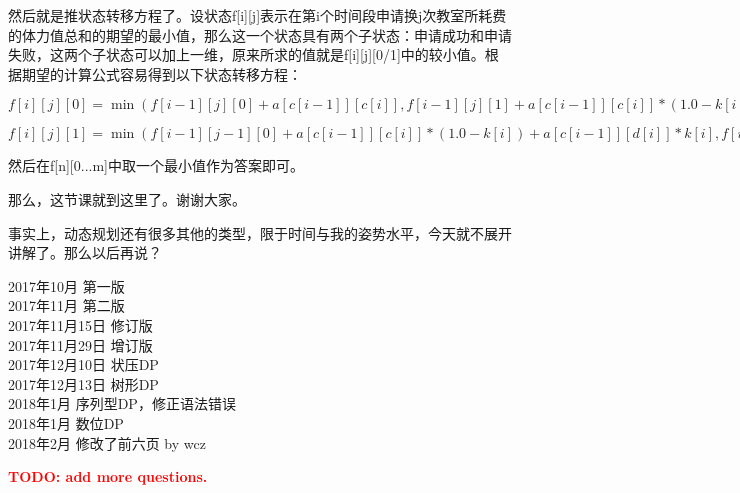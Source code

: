 	然后就是推状态转移方程了。设状态f[i][j]表示在第i个时间段申请换j次教室所耗费的体力值总和的期望的最小值，那么这一个状态具有两个子状态：申请成功和申请失败，这两个子状态可以加上一维，原来所求的值就是f[i][j][0/1]中的较小值。根据期望的计算公式容易得到以下状态转移方程：

$f[i][j][0]=\min(f[i-1][j][0]+a[c[i-1]][c[i]],f[i-1][j][1]+a[c[i-1]][c[i]]*(1.0-k[i-1])+a[d[i-1]][c[i]]*k[i-1]); $

$f[i][j][1]=\min(f[i-1][j-1][0]+a[c[i-1]][c[i]]*(1.0-k[i])+a[c[i-1]][d[i]]*k[i],f[i-1][j-1][1]+a[c[i-1]][c[i]]*(1.0-k[i])*(1.0-k[i-1])+a[d[i-1]][c[i]]*k[i-1]*(1.0-k[i])+a[c[i-1]][d[i]]*(1.0-k[i-1])*(k[i])+a[d[i-1]][d[i]]*k[i-1]*k[i]);$

然后在f[n][0...m]中取一个最小值作为答案即可。

那么，这节课就到这里了。谢谢大家。

事实上，动态规划还有很多其他的类型，限于时间与我的姿势水平，今天就不展开讲解了。那么以后再说？

\note


\begin{flushright}
	2017年10月 第一版\\
	2017年11月 第二版\\
	2017年11月15日 修订版\\
	2017年11月29日 增订版\\
	2017年12月10日 状压DP\\
	2017年12月13日 树形DP\\
	2018年1月 序列型DP，修正语法错误\\
	2018年1月 数位DP\\
	2018年2月 修改了前六页 by wcz
\end{flushright}
\begin{center}\textcolor{red}{\huge{\textbf{TODO: add more questions.}}}\end{center}
